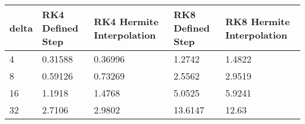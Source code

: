 \begin{tabular}{lllll}
delta & RK4 Defined Step & RK4 Hermite Interpolation & RK8 Defined Step & RK8 Hermite Interpolation \\ 
\hline 
4 & 0.31588 & 0.36996 & 1.2742 & 1.4822 \\ 
8 & 0.59126 & 0.73269 & 2.5562 & 2.9519 \\ 
16 & 1.1918 & 1.4768 & 5.0525 & 5.9241 \\ 
32 & 2.7106 & 2.9802 & 13.6147 & 12.63 \\ 
\hline 
\end{tabular}